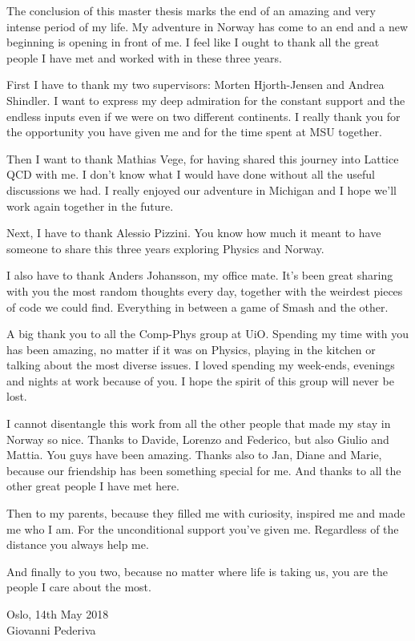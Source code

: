 The conclusion of this master thesis marks the end of an amazing and very intense period of my life. My adventure in Norway has come to an end and a new beginning is opening in front of me. I feel like I ought to thank all the great people I have met and worked with in these three years. 

First I have to thank my two supervisors: Morten Hjorth-Jensen and Andrea Shindler. I want to express my deep admiration for the constant support and the endless inputs even if we were on two different continents. I really thank you for the opportunity you have given me and for the time spent at MSU together.

Then I want to thank Mathias Vege, for having shared this journey into Lattice QCD with me. I don't know what I would have done without all the useful discussions we had. I really enjoyed our adventure in Michigan and I hope we'll work again together in the future.

Next, I have to thank Alessio Pizzini. You know how much it meant to have someone to share this three years exploring Physics and Norway. 

I also have to thank Anders Johansson, my office mate. It's been great sharing with you the most random thoughts every day, together with the weirdest pieces of code we could find. Everything in between a game of Smash and the other.

A big thank you to all the Comp-Phys group at UiO. Spending my time with you has been amazing, no matter if it was on Physics, playing in the kitchen or talking about the most diverse issues. I loved spending my week-ends, evenings and nights at work because of you. I hope the spirit of this group will never be lost.

I cannot disentangle this work from all the other people that made my stay in Norway so nice. Thanks to Davide, Lorenzo and Federico, but also Giulio and Mattia. You guys have been amazing. Thanks also to Jan, Diane and Marie, because our friendship has been something special for me. And thanks to all the other great people I have met here.

Then to my parents, because they filled me with curiosity, inspired me and made me who I am. For the unconditional support you've given me. Regardless of the distance you always help me.

And finally to you two, because no matter where life is taking us, you are the people I care about the most.

\vspace{2cm}
\begin{flushright}
    Oslo, 14th May 2018\\
    Giovanni Pederiva    
\end{flushright}





